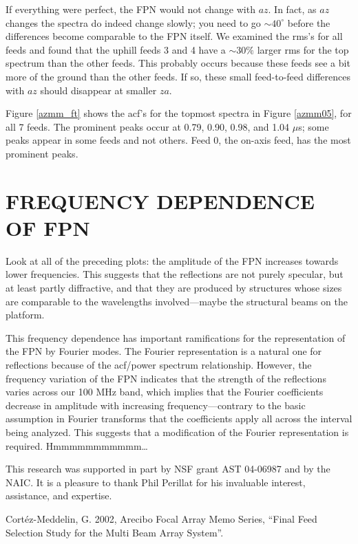 \documentclass[psfig,preprint]{aastex}
\begin{document}
	If everything were perfect, the FPN would not change with $az$. 
In fact, as $az$ changes the spectra do indeed change slowly; you need
to go $\sim 40^\circ$ before the differences become comparable to the
FPN itself.  We examined the rms's for all feeds and found that the
uphill feeds 3 and 4 have a $\sim 30\%$ larger rms for the top spectrum
than the other feeds.  This probably occurs because these feeds see a
bit more of the ground than the other feeds.  If so, these small
feed-to-feed differences with $az$ should disappear at smaller $za$. 

	Figure \ref{azmm_ft} shows the acf's for the topmost spectra in
Figure \ref{azmm05}, for all 7 feeds.  The prominent
peaks occur at 0.79, 0.90, 0.98, and 1.04 $\mu$s; some peaks appear in some
feeds and not others. Feed 0, the on-axis feed, has the most prominent
peaks.

\section{FREQUENCY DEPENDENCE OF FPN} \label{freq}

	Look at all of the preceding plots: the amplitude of the FPN
increases towards lower frequencies.  This suggests that the reflections
are not purely specular, but at least partly diffractive, and that they
are produced by structures whose sizes are comparable to the wavelengths
involved---maybe the structural beams on the platform. 

	This frequency dependence has important ramifications for the
representation of the FPN by Fourier modes. The Fourier representation
is a natural one for reflections because of the acf/power spectrum
relationship. However, the frequency variation of the FPN indicates that
the strength of the reflections varies across our 100 MHz band, which
implies that the Fourier coefficients decrease in amplitude with
increasing frequency---contrary to the basic assumption in Fourier
transforms that the coefficients apply all across the interval being
analyzed. This suggests that a modification of the Fourier
representation is required. Hmmmmmmmmmmm\dots

\acknowledgements

	This research was supported in part by NSF grant AST 04-06987
and by the NAIC.  It is a pleasure to thank Phil Perillat for his
invaluable interest, assistance, and expertise. 

\begin{references}
 Cort\'ez-Meddelin, G. 2002, Arecibo Focal Array Memo
Series, ``Final Feed Selection Study for the Multi Beam Array System''.

\end{references}
\end{document}
